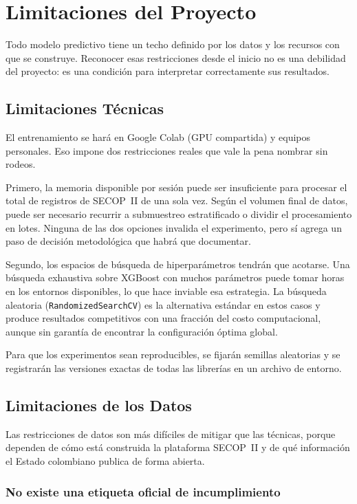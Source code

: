 \section{Limitaciones del Proyecto}

Todo modelo predictivo tiene un techo definido por los datos y los recursos con que
se construye. Reconocer esas restricciones desde el inicio no es una debilidad del
proyecto: es una condición para interpretar correctamente sus resultados.

\subsection{Limitaciones Técnicas}

El entrenamiento se hará en Google Colab (GPU compartida) y equipos personales.
Eso impone dos restricciones reales que vale la pena nombrar sin rodeos.

Primero, la memoria disponible por sesión puede ser insuficiente para procesar el
total de registros de SECOP~II de una sola vez. Según el volumen final de datos,
puede ser necesario recurrir a submuestreo estratificado o dividir el procesamiento
en lotes. Ninguna de las dos opciones invalida el experimento, pero sí agrega
un paso de decisión metodológica que habrá que documentar.

Segundo, los espacios de búsqueda de hiperparámetros tendrán que acotarse.
Una búsqueda exhaustiva sobre XGBoost con muchos parámetros puede tomar horas
en los entornos disponibles, lo que hace inviable esa estrategia. La búsqueda
aleatoria (\texttt{RandomizedSearchCV}) es la alternativa estándar en estos casos
y produce resultados competitivos con una fracción del costo computacional, aunque
sin garantía de encontrar la configuración óptima global.

Para que los experimentos sean reproducibles, se fijarán semillas aleatorias y se
registrarán las versiones exactas de todas las librerías en un archivo de entorno.

\subsection{Limitaciones de los Datos}

Las restricciones de datos son más difíciles de mitigar que las técnicas, porque
dependen de cómo está construida la plataforma SECOP~II y de qué información
el Estado colombiano publica de forma abierta.

\subsubsection{No existe una etiqueta oficial de incumplimiento}

